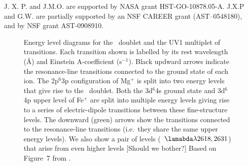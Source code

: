 \documentclass[12pt,preprint]{aastex}
\begin{document}
\acknowledgments

J. X. P. and J.M.O. are supported by NASA grant
HST-GO-10878.05-A.  J.X.P and G.W. are partially supported
by an NSF CAREER grant (AST--0548180), and 
by NSF grant AST-0908910.





%

\begin{figure}
\caption{
Energy level diagrams for the \mgiid\ doublet and the UV1
multiplet of  transitions.   Each transition shown is
labelled by its rest wavelength (\AA) and Einstein A-coefficient
(s$^{-1}$). Black updward arrows
indicate the resonance-line transitions connected to the ground
state of each ion.  The 2p$^6$3p configuration of Mg$^+$ is split into
two energy levels that give rise to the \mgiid\ doublet.  
Both the 3d$^6$4s ground state and 3d$^6$4p upper level of Fe$^+$
are split into multiple energy levels giving rise to a series of
electric-dipole transitions between these fine-structure levels.   
The downward (green) arrows show the transitions connected to the
resonance-line transitions (i.e.\ they share the same upper energy
levels).  We also show a pair of levels (~$\lamabda\lambda
2618,2631$) that arise from even higher levels [Should we bother?]
Based on Figure~7 from \cite{hartagan9X}.
}
\label{fig:energy}
\end{figure}
\end{document}
